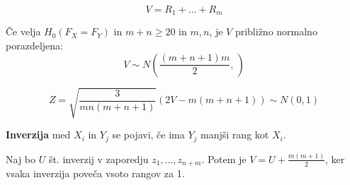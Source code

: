 \begin{multicols}{5}
\[ V = R_1 + \dots + R_m \]

Če velja $H_0(F_X = F_Y)$ in $m+n \geq 20$ in $m,n$, je $V$ približno normalno porazdeljena:
\[ V \sim N\left( \frac{(m+n+1)m}{2}, \frac{}{} \right)\]

\[ Z = \sqrt{\frac{3}{mn(m+n+1)}} (2V - m(m+n+1)) \sim N(0,1) \]

\textbf{Inverzija} med $X_i$ in $Y_j$ se pojavi, če ima $Y_j$ manjši rang kot $X_i$.

Naj bo $U$ št. inverzij v zaporedju $z_1, \dots, z_{n+m}$. Potem je $V = U + \frac{m(m+1)}{2}$, ker vsaka inverzija poveča vsoto rangov za 1.

\end{multicols}
